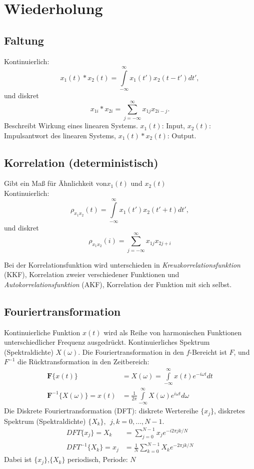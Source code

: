 \chapter{Wiederholung}

\section{Faltung}
Kontinuierlich: 
\begin{equation}
x_1(t) \ast x_2(t)= \int\limits_{-\infty}^{\infty} x_1(t')x_2(t-t')dt',
\end{equation}
und diskret
\begin{equation}
x_{1i} \ast x_{2i} = \sum\limits_{j=-\infty}^{\infty} x_{1j} x_{2i-j}.
\end{equation}
Beschreibt Wirkung eines linearen Systems. $x_1(t)$: Input, $x_2(t)$: Impulsantwort des linearen Systems, $x_1(t) \ast x_2(t)$: Output.


\section{Korrelation (deterministisch)}
Gibt ein Maß für Ähnlichkeit von$ x_1(t)$ und $x_2(t)$\\
Kontinuierlich:
\begin{equation}
\rho_{x_1x_2}(t)= \int\limits_{-\infty}^{\infty} x_1(t')x_2(t'+t)dt',
\end{equation}
und diskret
\begin{equation}
\rho_{x_1x_2}(i) = \sum\limits_{j=-\infty}^{\infty} x_{1j} x_{2j+i}
\end{equation}

Bei der Korrelationsfunktion wird unterschieden in \textit{Kreuzkorrelationsfunktion} (KKF), Korrelation zweier verschiedener Funktionen und \textit{Autokorrelationsfunktion} (AKF), Korrelation der Funktion mit sich selbst.

\section{Fouriertransformation}
Kontinuierliche Funktion $x(t)$ wird als Reihe von harmonischen Funktionen unterschiedlicher Frequenz ausgedrückt. Kontinuierliches Spektrum (Spektraldichte) $X(\omega)$. Die Fouriertransformation in den $f$-Bereicht ist $F$, und $F^{-1}$ die Rücktransformation in den Zeitbereich:
\begin{align}
\textbf{F}\{x(t)\}  & = X(\omega)=\int\limits_{-\infty}^{\infty} x(t) e^{-i\omega t}dt\\
\textbf{F}^{-1}\{X(\omega)\} = x(t) & =\frac {1}{2\pi}\int\limits_{-\infty}^{\infty} X(\omega) e^{i\omega t}d\omega
\end{align}
Die Diskrete Fouriertransformation (DFT): diskrete Wertereihe $\{x_j\}$, diskretes Spektrum (Spektraldichte) $\{X_k\}, ~~ j,k=0,\dots,N-1$.
\begin{align}
DFT\{ x_j \} = X_k & =\sum\limits_{j=0}^{N-1}x_j e^{-i2\pi jk/N} \\
DFT^{-1}\{X_k\} = x_j & =\frac{1}{N} \sum\limits_{k=0}^{N-1}X_k e^{-2\pi jk/N}
\end{align}
Dabei ist $\{x_j\}$,$\{X_k\}$ periodisch, Periode: $N$\\

